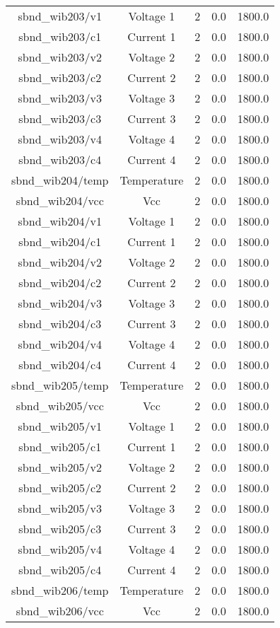 \begin{table}[ptb]
\begin{tabular}{c | c c c c}
sbnd_wib203/v1 & Voltage 1 & 2 & 0.0 & 1800.0\\ 
sbnd_wib203/c1 & Current 1 & 2 & 0.0 & 1800.0\\ 
sbnd_wib203/v2 & Voltage 2 & 2 & 0.0 & 1800.0\\ 
sbnd_wib203/c2 & Current 2 & 2 & 0.0 & 1800.0\\ 
sbnd_wib203/v3 & Voltage 3 & 2 & 0.0 & 1800.0\\ 
sbnd_wib203/c3 & Current 3 & 2 & 0.0 & 1800.0\\ 
sbnd_wib203/v4 & Voltage 4 & 2 & 0.0 & 1800.0\\ 
sbnd_wib203/c4 & Current 4 & 2 & 0.0 & 1800.0\\ 
sbnd_wib204/temp & Temperature & 2 & 0.0 & 1800.0\\ 
sbnd_wib204/vcc & Vcc & 2 & 0.0 & 1800.0\\ 
sbnd_wib204/v1 & Voltage 1 & 2 & 0.0 & 1800.0\\ 
sbnd_wib204/c1 & Current 1 & 2 & 0.0 & 1800.0\\ 
sbnd_wib204/v2 & Voltage 2 & 2 & 0.0 & 1800.0\\ 
sbnd_wib204/c2 & Current 2 & 2 & 0.0 & 1800.0\\ 
sbnd_wib204/v3 & Voltage 3 & 2 & 0.0 & 1800.0\\ 
sbnd_wib204/c3 & Current 3 & 2 & 0.0 & 1800.0\\ 
sbnd_wib204/v4 & Voltage 4 & 2 & 0.0 & 1800.0\\ 
sbnd_wib204/c4 & Current 4 & 2 & 0.0 & 1800.0\\ 
sbnd_wib205/temp & Temperature & 2 & 0.0 & 1800.0\\ 
sbnd_wib205/vcc & Vcc & 2 & 0.0 & 1800.0\\ 
sbnd_wib205/v1 & Voltage 1 & 2 & 0.0 & 1800.0\\ 
sbnd_wib205/c1 & Current 1 & 2 & 0.0 & 1800.0\\ 
sbnd_wib205/v2 & Voltage 2 & 2 & 0.0 & 1800.0\\ 
sbnd_wib205/c2 & Current 2 & 2 & 0.0 & 1800.0\\ 
sbnd_wib205/v3 & Voltage 3 & 2 & 0.0 & 1800.0\\ 
sbnd_wib205/c3 & Current 3 & 2 & 0.0 & 1800.0\\ 
sbnd_wib205/v4 & Voltage 4 & 2 & 0.0 & 1800.0\\ 
sbnd_wib205/c4 & Current 4 & 2 & 0.0 & 1800.0\\ 
sbnd_wib206/temp & Temperature & 2 & 0.0 & 1800.0\\ 
sbnd_wib206/vcc & Vcc & 2 & 0.0 & 1800.0\\ 

\end{tabular}
\end{table}
